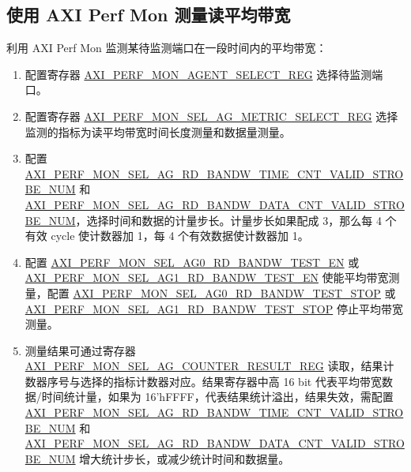 \documentclass[main\_\_CN.tex]{subfiles}
\begin{document}
\subsection{使用 AXI Perf Mon 测量读平均带宽}
利用 AXI Perf Mon 监测某待监测端口在一段时间内的平均带宽：
\begin{enumerate}
    \item 配置寄存器 \hyperref[regdesc:AXIPERFMONAGENTSELECTREG]{AXI\_PERF\_MON\_AGENT\_SELECT\_REG} 选择待监测端口。
    \item 配置寄存器 \hyperref[regdesc:AXIPERFMONSELAGNMETRICSELECTMREG]{AXI\_PERF\_MON\_SEL\_AG\_METRIC\_SELECT\_REG} 选择监测的指标为读平均带宽时间长度测量和数据量测量。
    \item 配置 \hyperref[fielddesc:AXIPERFMONSELAGNRDBANDWTIMECNTVALIDSTROBENUM]{AXI\_PERF\_MON\_SEL\_AG\_RD\_BANDW\_TIME\_CNT\_VALID\_STROBE\_NUM} 和 \hyperref[fielddesc:AXIPERFMONSELAGNRDBANDWDATACNTVALIDSTROBENUM]{AXI\_PERF\_MON\_SEL\_AG\_RD\_BANDW\_DATA\_CNT\_VALID\_STROBE\_NUM}，选择时间和数据的计量步长。计量步长如果配成 3，那么每 4 个有效 cycle 使计数器加 1，每 4 个有效数据使计数器加 1。
    \item 配置 \hyperref[fielddesc:AXIPERFMONSELAG0RDBANDWTESTEN]{AXI\_PERF\_MON\_SEL\_AG0\_RD\_BANDW\_TEST\_EN} 或 \hyperref[fielddesc:AXIPERFMONSELAG1RDBANDWTESTEN]{AXI\_PERF\_MON\_SEL\_AG1\_RD\_BANDW\_TEST\_EN} 使能平均带宽测量，配置 \hyperref[fielddesc:AXIPERFMONSELAG0RDBANDWTESTSTOP]{AXI\_PERF\_MON\_SEL\_AG0\_RD\_BANDW\_TEST\_STOP} 或 \hyperref[fielddesc:AXIPERFMONSELAG1RDBANDWTESTSTOP]{AXI\_PERF\_MON\_SEL\_AG1\_RD\_BANDW\_TEST\_STOP} 停止平均带宽测量。
    \item 测量结果可通过寄存器 \hyperref[regdesc:AXIPERFMONSELAGNCOUNTERMREG]{AXI\_PERF\_MON\_SEL\_AG\_COUNTER\_RESULT\_REG} 读取，结果计数器序号与选择的指标计数器对应。结果寄存器中高 16 bit 代表平均带宽数据/时间统计量，如果为 16'hFFFF，代表结果统计溢出，结果失效，需配置 \hyperref[fielddesc:AXIPERFMONSELAGNRDBANDWTIMECNTVALIDSTROBENUM]{AXI\_PERF\_MON\_SEL\_AG\_RD\_BANDW\_TIME\_CNT\_VALID\_STROBE\_NUM} 和 \hyperref[fielddesc:AXIPERFMONSELAGNRDBANDWDATACNTVALIDSTROBENUM]{AXI\_PERF\_MON\_SEL\_AG\_RD\_BANDW\_DATA\_CNT\_VALID\_STROBE\_NUM} 增大统计步长，或减少统计时间和数据量。
\end{enumerate}
\end{document}
